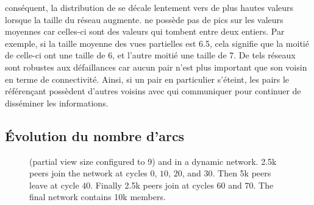 \begin{asparadesc}
  conséquent, la distribution de \SPRAY se décale lentement vers de plus hautes
  valeurs lorsque la taille du réseau augmente. \SPRAY ne possède pas de pics
  sur les valeurs moyennes car celles-ci sont des valeurs qui tombent entre deux
  entiers. Par exemple, si la taille moyenne des vues partielles est 6.5, cela
  signifie que la moitié de celle-ci ont une taille de 6, et l'autre moitié une
  taille de 7. De tels réseaux sont robustes aux défaillances car aucun pair
  n'est plus important que son voisin en terme de connectivité. Ainsi, si un
  pair en particulier s'éteint, les pairs le référençant possèdent d'autres
  voisins avec qui communiquer pour continuer de disséminer les informations.
\end{asparadesc}

\subsection{Évolution du nombre d'arcs}

\begin{figure}
  \centering
  \hspace{10pt}
  \caption{\label{fig:spray:churn}\CYCLON (partial view size configured to 9)
    and \SPRAY in a dynamic network. 2.5k peers join the network at cycles $0$,
    $10$, $20$, and $30$. Then 5k peers leave at cycle $40$. Finally 2.5k peers
    join at cycles $60$ and $70$. The final network contains 10k members.}
\end{figure}


